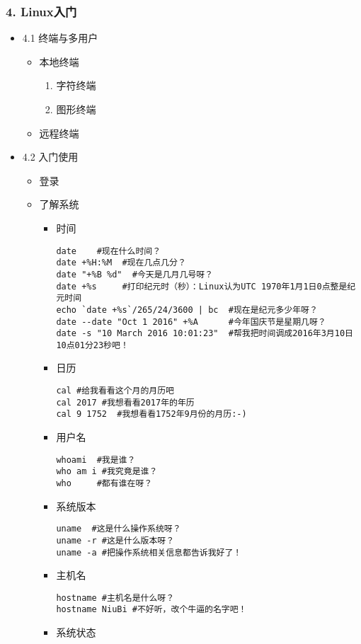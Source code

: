 \documentclass[bigger]{beamer}
\begin{document}
\begin{frame}[fragile]
\frametitle{4. Linux入门}
\label{sec-1-4}
\begin{itemize}

\item 4.1 终端与多用户
\label{sec-1-4-1}%
\begin{itemize}
\item 本地终端
\begin{enumerate}
\item 字符终端
\item 图形终端
\end{enumerate}
\item 远程终端
\end{itemize}

\item 4.2 入门使用
\label{sec-1-4-2}%
\begin{itemize}
\item 登录
\item 了解系统
\begin{itemize}
\item 时间

\begin{verbatim}
date    #现在什么时间？
date +%H:%M  #现在几点几分？
date "+%B %d"  #今天是几月几号呀？
date +%s     #打印纪元时（秒）：Linux认为UTC 1970年1月1日0点整是纪元时间
echo `date +%s`/265/24/3600 | bc  #现在是纪元多少年呀？
date --date "Oct 1 2016" +%A      #今年国庆节是星期几呀？
date -s "10 March 2016 10:01:23"  #帮我把时间调成2016年3月10日10点01分23秒吧！
\end{verbatim}
\item 日历

\begin{verbatim}
cal #给我看看这个月的月历吧
cal 2017 #我想看看2017年的年历
cal 9 1752  #我想看看1752年9月份的月历:-)
\end{verbatim}
\item 用户名

\begin{verbatim}
whoami  #我是谁？
who am i #我究竟是谁？
who     #都有谁在呀？
\end{verbatim}
\item 系统版本

\begin{verbatim}
uname  #这是什么操作系统呀？
uname -r #这是什么版本呀？
uname -a #把操作系统相关信息都告诉我好了！
\end{verbatim}
\item 主机名

\begin{verbatim}
hostname #主机名是什么呀？
hostname NiuBi #不好听，改个牛逼的名字吧！
\end{verbatim}
\item 系统状态


\end{itemize}
\end{itemize}
\end{itemize}
\end{frame}
\end{document}
